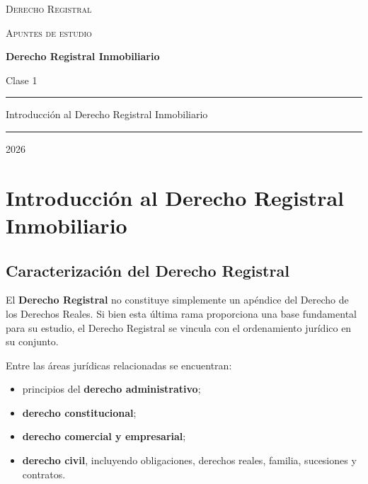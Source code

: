 \documentclass[12pt,oneside]{book}
\begin{document}
\begin{titlepage}
\thispagestyle{empty}
\begin{center}
\vspace*{1cm}
{\large \textsc{Derecho Registral}}
\vspace{0.2cm}

{\large \textsc{Apuntes de estudio}}

\vspace{3cm}

{\Huge \textbf{Derecho Registral Inmobiliario}}

\vspace{1cm}

{\LARGE Clase 1}

\vspace{1.5cm}
\rule{0.70\textwidth}{0.5pt}

\vspace{0.5cm}
{\large Introducción al Derecho Registral Inmobiliario}
\vspace{0.5cm}

\rule{0.70\textwidth}{0.5pt}

\vfill
{\large 2026}
\end{center}
\end{titlepage}

\tableofcontents
\clearpage

\chapter{Introducción al Derecho Registral Inmobiliario}

\section{Caracterización del Derecho Registral}

El \textbf{Derecho Registral} no constituye simplemente un apéndice del Derecho de los Derechos Reales. Si bien esta última rama proporciona una base fundamental para su estudio, el Derecho Registral se vincula con el ordenamiento jurídico en su conjunto.

Entre las áreas jurídicas relacionadas se encuentran:

\begin{itemize}
    \item principios del \textbf{derecho administrativo};
    \item \textbf{derecho constitucional};
    \item \textbf{derecho comercial y empresarial};
    \item \textbf{derecho civil}, incluyendo obligaciones, derechos reales, familia, sucesiones y contratos.
\end{itemize}
\end{document}
